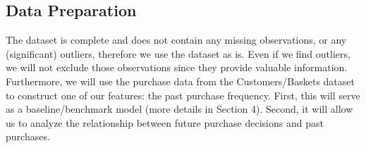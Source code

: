 \subsection{Data Preparation}
The dataset is complete and does not contain any missing observations, or any
(significant) outliers, therefore we use the dataset as is. Even if we find
outliers, we will not exclude those observations since they provide valuable
information. Furthermore, we will use the purchase data from the
Customers/Baskets dataset to construct one of our features: the past purchase
frequency. First, this will serve as a baseline/benchmark model (more details in
Section 4). Second, it will allow us to analyze the relationship between future
purchase decisions and past purchases.
